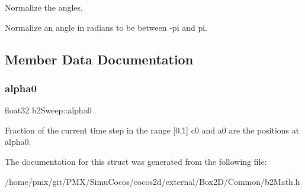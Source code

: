 Normalize the angles. 

Normalize an angle in radians to be between -\/pi and pi. 

\subsection{Member Data Documentation}
\mbox{\label{structb2Sweep_aa5f8ab90178b58bc0777096cbc6b91cf}} 
\subsubsection{\texorpdfstring{alpha0}{alpha0}}
{\footnotesize\ttfamily float32 b2\+Sweep\+::alpha0}

Fraction of the current time step in the range \mbox{[}0,1\mbox{]} c0 and a0 are the positions at alpha0. 

The documentation for this struct was generated from the following file\+:\begin{DoxyCompactItemize}
\item 
/home/pmx/git/\+P\+M\+X/\+Simu\+Cocos/cocos2d/external/\+Box2\+D/\+Common/b2\+Math.\+h\end{DoxyCompactItemize}
